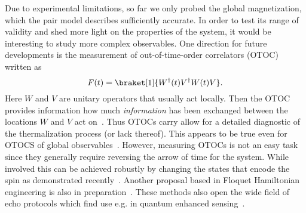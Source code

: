 Due to experimental limitations, so far we only probed the global magnetization, which the pair model describes sufficiently accurate. In order to test its range of validity and shed more light on the properties of the system, it would be interesting to study more complex observables.
One direction for future developments is the measurement of out-of-time-order correlators (OTOC) written as
\begin{equation}
	F(t) = \braket[1]{W^\dagger(t)V^\dagger W(t)V}.
\end{equation}
Here $W$ and $V$ are unitary operators that usually act locally. Then the OTOC provides information how much \emph{information} has been exchanged between the locations $W$ and $V$ act on~\cite{chenOutTimeOrder2017,swingleUnscramblingPhysicsOutoftimeorder2018,luitzEmergentLocalitySystems2019,xuScramblingDynamicsOutofTimeOrdered2024}. Thus OTOCs carry allow for a detailed diagnostic of the thermalization process (or lack thereof). This appears to be true even for OTOCS of global observables~\cite{lozano-negroGlobalOutTime2024}. However, measuring OTOCs is not an easy task since they generally require reversing the arrow of time for the system. While involved this can be achieved robustly by changing the states that encode the spin as demonstrated recently~\cite{geierTimereversalDipolarQuantum2024}. Another proposal based in Floquet Hamiltonian engineering is also in preparation~\cite{muellenbachOTOC}. 
These methods also open the wide field of echo protocols which find use e.g. in quantum enhanced sensing~\cite{davisApproachingHeisenbergLimit2016,linnemannQuantumEnhancedSensingBased2016,colomboTimereversalbasedQuantumMetrology2022}.

